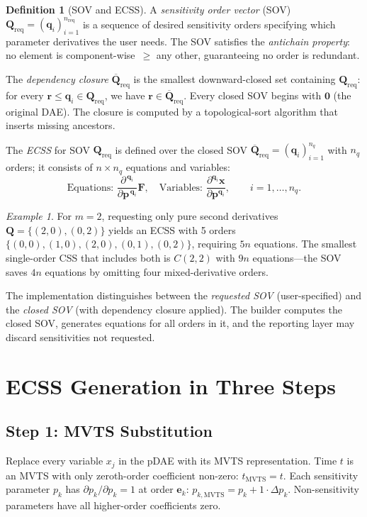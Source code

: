 \documentclass[12pt,a4paper]{article}
\theoremstyle{definition}
\newtheorem{definition}{Definition}[section]
\theoremstyle{plain}
\theoremstyle{remark}
\newtheorem{example}{Example}[section]
\newcommand{\vx}{\mathbf{x}}
\newcommand{\vp}{\mathbf{p}}
\newcommand{\vq}{\mathbf{q}}
\newcommand{\vQ}{\mathbf{Q}}
\newcommand{\vr}{\mathbf{r}}
\newcommand{\vF}{\mathbf{F}}
\newcommand{\vz}{\mathbf{0}}
\newcommand{\D}[2]{\frac{\partial^{\,#2}}{\partial #1^{\,#2}}}
\begin{document}
\begin{definition}[SOV and ECSS]
A \emph{sensitivity order vector} (SOV) $\vQ_{\text{req}} = (\vq_i)_{i=1}^{n_{\text{req}}}$ is a sequence of desired sensitivity orders specifying which parameter derivatives the user needs. The SOV satisfies the \emph{antichain property}: no element is component-wise~$\ge$ any other, guaranteeing no order is redundant.

The \emph{dependency closure} $\overline{\vQ}_{\text{req}}$ is the smallest downward-closed set containing $\vQ_{\text{req}}$: for every $\vr \le \vq_i \in \vQ_{\text{req}}$, we have $\vr \in \overline{\vQ}_{\text{req}}$. Every closed SOV begins with $\vz$ (the original DAE). The closure is computed by a topological-sort algorithm that inserts missing ancestors.

The \emph{ECSS} for SOV $\vQ_{\text{req}}$ is defined over the closed SOV $\overline{\vQ}_{\text{req}} = (\vq_i)_{i=1}^{n_q}$ with $n_q$ orders; it consists of $n\times n_q$ equations and variables:
\[
  \text{Equations: } \D{\vp}{\vq_i}\vF,\quad
  \text{Variables: } \frac{\partial^{\vq_i}\vx}{\partial\vp^{\vq_i}},\qquad i=1,\dots,n_q.
\]
\end{definition}

\begin{example}
For $m=2$, requesting only pure second derivatives $\vQ = \{(2,0),(0,2)\}$ yields an ECSS with 5 orders $\{(0,0),(1,0),(2,0),(0,1),(0,2)\}$, requiring $5n$ equations. The smallest single-order CSS that includes both is $C(2,2)$ with $9n$ equations---the SOV saves $4n$ equations by omitting four mixed-derivative orders.
\end{example}

The implementation distinguishes between the \emph{requested SOV} (user-specified) and the \emph{closed SOV} (with dependency closure applied). The builder computes the closed SOV, generates equations for all orders in it, and the reporting layer may discard sensitivities not requested.

\section{ECSS Generation in Three Steps}
\label{sec:generation}

\subsection{Step 1: MVTS Substitution}

Replace every variable $x_j$ in the pDAE with its MVTS representation. Time $t$ is an MVTS with only zeroth-order coefficient non-zero: $t_{\text{MVTS}} = t$. Each sensitivity parameter $p_k$ has $\partial p_k/\partial p_k = 1$ at order $\mathbf{e}_k$: $p_{k,\text{MVTS}} = p_k + 1\cdot\Delta p_k$. Non-sensitivity parameters have all higher-order coefficients zero.
\end{document}
